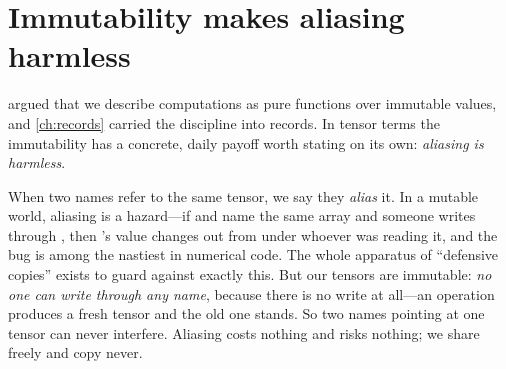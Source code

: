 \section{Immutability makes aliasing harmless}
\label{sec:t-aliasing}

 argued that we describe computations as pure functions over
immutable values, and \cref{ch:records} carried the discipline into records. In
tensor terms the immutability has a concrete, daily payoff worth stating on its
own: \emph{aliasing is harmless}.

When two names refer to the same tensor, we say they \emph{alias} it. In a
mutable world, aliasing is a hazard---if  and  name the same
array and someone writes through , then 's value changes out from
under whoever was reading it, and the bug is among the nastiest in numerical
code. The whole apparatus of ``defensive copies'' exists to guard against exactly
this. But our tensors are immutable: \emph{no one can write through any name},
because there is no write at all---an operation produces a fresh tensor and the
old one stands. So two names pointing at one tensor can never interfere. Aliasing
costs nothing and risks nothing; we share freely and copy never.


